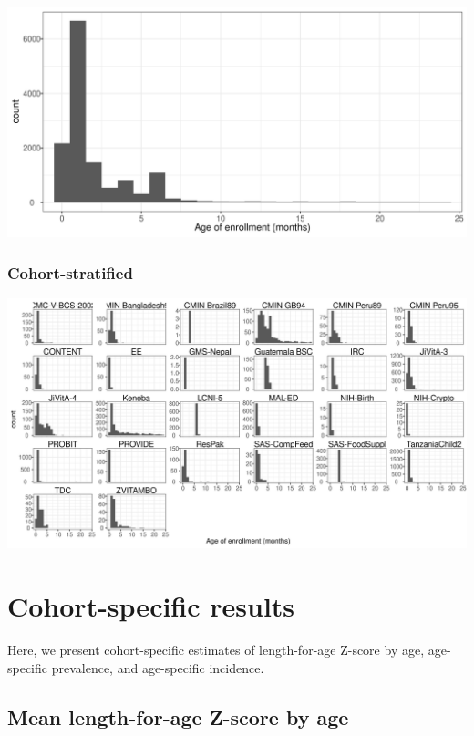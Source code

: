 \documentclass[
  9pt,
]{book}
\begin{document}
\includegraphics[width=33.33in]{figures//shared/enrollment_age_histogram_over_7d}

\hypertarget{cohort-stratified-1}{%
\subsection{Cohort-stratified}\label{cohort-stratified-1}}

\includegraphics[width=45.83in]{figures//shared/enrollment_age_histogram_over_7d_cohort}

\hypertarget{cohort}{%
\chapter{Cohort-specific results}\label{cohort}}

\raggedright

Here, we present cohort-specific estimates of length-for-age Z-score by age, age-specific prevalence, and age-specific incidence.

\hypertarget{mean-length-for-age-z-score-by-age}{%
\section{Mean length-for-age Z-score by age}\label{mean-length-for-age-z-score-by-age}}
\end{document}
